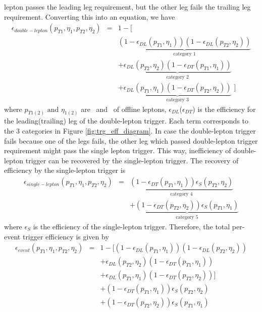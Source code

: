 lepton passes the leading leg requirement, but the other leg fails the trailing leg 
requirement. Converting this into an equation, we have 
\begin{eqnarray} 
\label{eq:doubletrgeff}
\epsilon_{double-lepton} \left( p_{T1},\eta_1,p_{T2},\eta_2 \right)
&=&    
1 - \Big[   \\ 
& & 
\underbrace{
\left(1 - \epsilon_{DL}\left(p_{T1}, \eta_1\right)\right)
\left(1 - \epsilon_{DL}\left(p_{T2}, \eta_2\right)\right)  
}_\text{category 1} \\
& & 
+ \underbrace{
\epsilon_{DL}\left(p_{T2}, \eta_2\right)\left(1 - \epsilon_{DT}\left(p_{T1}, \eta_1\right)\right)
}_\text{category 2} \\
& &
+ \underbrace{
\epsilon_{DL}\left(p_{T1}, \eta_1\right)\left(1 - \epsilon_{DT}\left(p_{T2}, \eta_2\right)\right) 
}_\text{category 3}
\,\, \Big]
\end{eqnarray} 
where $p_{T1(2)} \textrm{ and } \eta_{1(2)}$ are \pt~and \Eta~of offline leptons, 
$\epsilon_{DL}$($\epsilon_{DT}$) is the efficiency for the leading(trailing) leg 
of the double-lepton trigger. 
Each term corresponds to the 3 categories in Figure \ref{fig:trg_eff_diagram}.
In case the double-lepton trigger fails because one of the legs fails, the other leg 
which passed double-lepton trigger requirement might pass the single lepton trigger. 
This way, inefficiency of double-lepton trigger can be recovered by the single-lepton trigger.
The recovery of efficiency by the single-lepton trigger is  
\begin{eqnarray} 
\label{eq:singletrgeff}
\epsilon_{single-lepton} \left( p_{T1},\eta_1,p_{T2},\eta_2 \right)
&=&    
\underbrace{
\left(1 - \epsilon_{DT}\left(p_{T1}, \eta_1\right)\right)
\epsilon_{S}\left(p_{T2}, \eta_2\right)  
}_\text{category 4} \\
& & 
+ \underbrace{
\left(1 - \epsilon_{DT}\left(p_{T2}, \eta_2\right)\right)
\epsilon_{S}\left(p_{T1}, \eta_1\right)  
}_\text{category 5} 
\end{eqnarray}
where $\epsilon_{S}$ is the efficiency of the single-lepton trigger. 
Therefore, the total per-event trigger efficiency is given by 
\begin{eqnarray} 
\label{eq:doubletrgeff}
\epsilon_{event} \left( p_{T1},\eta_1,p_{T2},\eta_2 \right)
&=&    
1 - \Big[    
\left(1 - \epsilon_{DL}\left(p_{T1}, \eta_1\right)\right)
\left(1 - \epsilon_{DL}\left(p_{T2}, \eta_2\right)\right)  \\ 
& & 
+ \epsilon_{DL}\left(p_{T2}, \eta_2\right)\left(1 - \epsilon_{DT}\left(p_{T1}, \eta_1\right)\right) \\
& &
+ \epsilon_{DL}\left(p_{T1}, \eta_1\right)\left(1 - \epsilon_{DT}\left(p_{T2}, \eta_2\right)\right)  
\Big] \\
& &
+ \left(1 - \epsilon_{DT}\left(p_{T1}, \eta_1\right)\right)
\epsilon_{S}\left(p_{T2}, \eta_2\right)  \\ 
& & 
+ \left(1 - \epsilon_{DT}\left(p_{T2}, \eta_2\right)\right)
\epsilon_{S}\left(p_{T1}, \eta_1\right)  
\end{eqnarray} 

